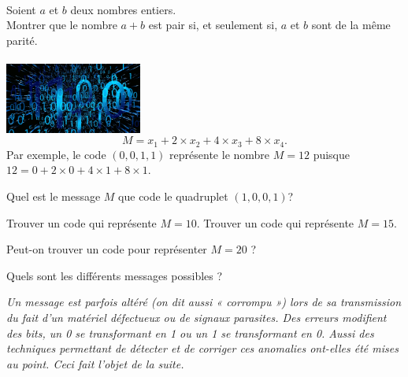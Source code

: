 \documentclass[a4paper,10pt,exos]{nsi}
\begin{document}
    \maketitle

    {\titlefont\color{UGLiBlue}{Question préliminaire}}\\
    \question Soient $a$ et $b$ deux nombres entiers.\\
    Montrer que le nombre $a+b$ est pair si, et seulement si, $a$ et $b$ sont de la même parité.\\

    {\titlefont\color{UGLiBlue}{Codage d'un message}}\\
    {\includegraphics[width=4.5cm]{binary.jpg}}
    $$ M=x_1+2\times x_2+4\times x_3+8\times x_4.$$
        Par exemple, le code $(0,0,1,1)$ représente le nombre $M = 12$ puisque $12=0+2\times 0+4\times 1+8\times 1$.\\

    \question \begin{enumalph}
        \item Quel est le message $M$ que code le quadruplet $(1,0,0,1)$?
        \item Trouver un code qui représente $M = 10$. Trouver un code qui représente $M = 15$.
        \item Peut-on trouver un code pour représenter $M = 20$ ?
        \item Quels sont les différents messages possibles ?
    \end{enumalph}

    \small{\textit{Un message est parfois altéré (on dit aussi « corrompu ») lors de sa transmission du fait d’un matériel défectueux ou de
    signaux parasites. Des erreurs modifient des bits, un 0 se transformant en 1 ou un 1 se transformant en 0. Aussi des
    techniques permettant de détecter et de corriger ces anomalies ont-elles été mises au point. Ceci fait l’objet de la suite.}}\\
\end{document}
